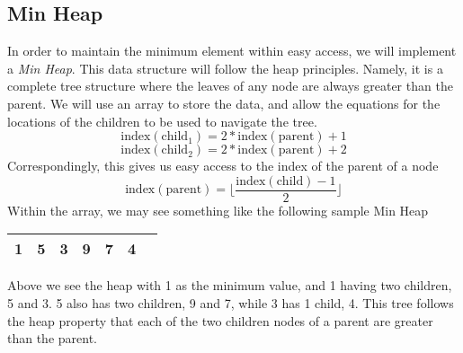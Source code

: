 \documentclass[titlepage]{article}
\numberwithin{equation}{subsection}
\begin{document}
\subsection{Min Heap}
In order to maintain the minimum element within easy access, we will implement a \textit{Min Heap}.
This data structure will follow the heap principles. Namely, it is a complete tree structure where the
leaves of any node are always greater than the parent. We will use an array to store the data, and allow the
equations for the locations of the children to be used to navigate the tree.
\begin{equation}
\text{index}(\text{child}_1) = 2*\text{index}(\text{parent}) + 1
\end{equation}
\begin{equation}
\text{index}(\text{child}_2) = 2*\text{index}(\text{parent}) + 2
\end{equation}
Correspondingly, this gives us easy access to the index of the parent of a node
\begin{equation}
\text{index}(\text{parent}) = \lfloor \frac{\text{index}(\text{child})-1}{2} \rfloor
\end{equation}
Within the array, we may see something like the following sample Min Heap
\begin{center}
    \begin{tabular}{|l|l|l|l|l|l|l|}
    \hline
    1 & 5 & 3 & 9 & 7 & 4 &  \\
    \hline
    \end{tabular}
    \end{center}
Above we see the heap with 1 as the minimum value, and 1 having two children, 5 and 3.
5 also has two children, 9 and 7, while 3 has 1 child, 4. This tree follows the heap property
that each of the two children nodes of a parent are greater than the parent.
\end{document}
